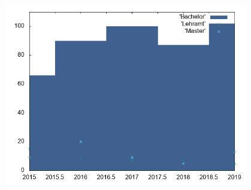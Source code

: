 \documentclass[12pt,fleqn] {article}
\begin{document}
{		\includegraphics[height=8cm]{new2.png}
	}
\end{document}
